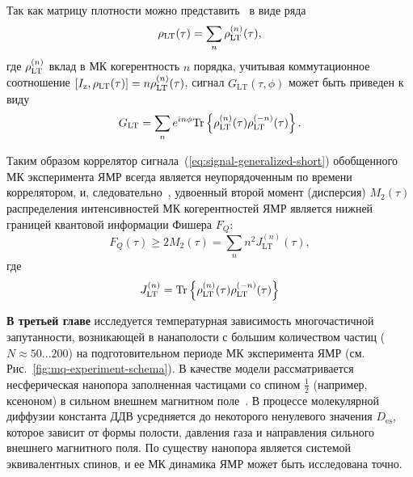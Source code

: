 %
Так как матрицу плотности можно представить~\cite{Feldman1997b}
в виде ряда
\begin{equation}
  \rho_\mathrm{LT} (\tau) = \sum_n \rho_\mathrm{LT}^{(n)} (\tau),
\end{equation}
%
где $\rho_\mathrm{LT}^{(n)}$ вклад в МК когерентность $n$ порядка,
учитывая коммутационное соотношение $\left[I_\mathrm{z}, \rho_\mathrm{LT}(\tau)\right] = n \rho_\mathrm{LT}^{(n)}(\tau)$,
сигнал $G_\mathrm{LT}(\tau, \phi)$ может быть приведен к виду
%
\begin{equation}
  G_\mathrm{LT} = \sum_n e^{in\phi} \mathrm{Tr} \left\{ 
    \rho_\mathrm{LT}^{(n)}(\tau)\rho_\mathrm{LT}^{(-n)}(\tau)
   \right\}.
\end{equation}
%

Таким образом коррелятор сигнала~(\ref{eq:signal-generalized-short}) обобщенного МК эксперимента ЯМР всегда является неупорядоченным по времени коррелятором,
и, следовательно~\cite{Garttner2018}, удвоенный второй момент (дисперсия) $M_2(\tau)$ распределения интенсивностей МК когерентностей ЯМР
является нижней границей квантовой информации Фишера $F_{Q}$:
%
\begin{equation}\label{eq:qfi-low-bound}
  F_{Q}(\tau)
  \geq 2M_2(\tau)
  = \sum\limits_n n^2 J_\mathrm{LT}^{(n)} (\tau),
\end{equation}
%
где
\begin{equation}\label{eq:coherence-k}
  J_\mathrm{LT}^{(n)} = \mathrm{Tr} \left\{ \rho_\mathrm{LT}^{(n)}(\tau)\rho_\mathrm{LT}^{(-n)}(\tau) \right\}
\end{equation}


\textbf{В третьей главе} исследуется температурная зависимость многочастичной запутанности,
возникающей в нанаполости с большим количеством частиц (\(N\approx50\dots200\)) на подготовительном периоде МК эксперимента ЯМР (см. Рис.~\ref{fig:mq-experiment-schema}).
В качестве модели рассматривается несферическая нанопора заполненная частицами со спином $\frac 1 2$ (например, ксеноном) в сильном внешнем магнитном поле~\cite{Baugh2001}.
В процессе молекулярной диффузии константа ДДВ усредняется до некоторого ненулевого значения $D_\mathrm{es}$,
которое зависит от формы полости, давления газа и направления сильного внешнего магнитного поля.
По существу нанопора является системой эквивалентных спинов,
и ее МК динамика ЯМР может быть исследована точно.

